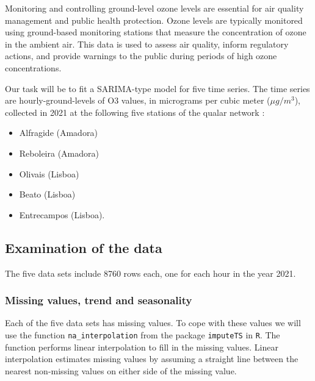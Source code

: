\documentclass{article}
\begin{document}
Monitoring and controlling ground-level ozone levels are essential for air quality management and public health protection. Ozone levels are typically monitored using ground-based monitoring stations that measure the concentration of ozone in the ambient air. This data is used to assess air quality, inform regulatory actions, and provide warnings to the public during periods of high ozone concentrations. \cite{i1}

Our task will be to fit a SARIMA-type model for five time series. The time series are hourly-ground-levels of $\text{O}3$ values, in micrograms per cubic meter ($\mu g/m^3$), collected in 2021 at the following five stations of the qualar network \cite{i2}:

\begin{itemize}
    \item Alfragide (Amadora)
    \item  Reboleira (Amadora)
    \item  Olivais (Lisboa)
    \item  Beato (Lisboa)
    \item  Entrecampos (Lisboa).
\end{itemize}


\subsection{Examination of the data}

The five data sets include 8760 rows each, one for each hour in the year 2021.
\subsubsection{Missing values, trend and seasonality}
Each of the five data sets has missing values. To cope with these values we will use the function \verb|na_interpolation| from the package \verb|imputeTS|  in \verb|R|. The function performs linear interpolation to fill in the missing values. Linear interpolation estimates missing values by assuming a straight line between the nearest non-missing values on either side of the missing value.
\end{document}
